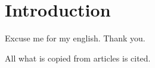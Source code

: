 







\section*{Introduction}

Excuse me for my english. Thank you. 

All what is copied from articles is cited. 

